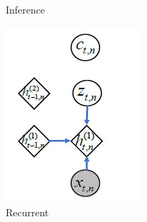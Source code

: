 \documentclass[letterpaper,12pt]{article}
\begin{document}
\begin{figure}[htbp]
\begin{subfigure}{0.19\textwidth}
				\captionsetup{font=scriptsize}
				\caption{Inference}
				\label{fig: Inference}	
			\end{subfigure}
			\begin{subfigure}{0.19\textwidth}
				\includegraphics[width=\linewidth]{Switching/Recurrent}
				\captionsetup{font=scriptsize}
				\caption{Recurrent}
				\label{fig: Recurrent}
			\end{subfigure}
			\begin{subfigure}{0.19\textwidth}

\end{subfigure}
\end{figure}
\end{document}
